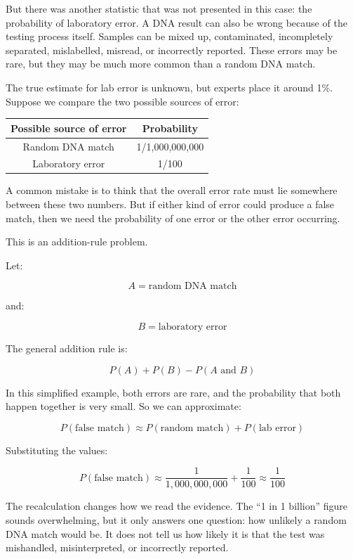 \documentclass[
  letterpaper,
  DIV=11,
  numbers=noendperiod]{scrreprt}
\begin{document}
\begin{tcolorbox}
But there was another statistic that was not presented in this case: the
probability of laboratory error. A DNA result can also be wrong because
of the testing process itself. Samples can be mixed up, contaminated,
incompletely separated, mislabelled, misread, or incorrectly reported.
These errors may be rare, but they may be much more common than a random
DNA match.

The true estimate for lab error is unknown, but experts place it around
1\%. Suppose we compare the two possible sources of error:

\begin{table}
\fontsize{12.0pt}{14.0pt}\selectfont
\begin{tabular*}{\linewidth}{@{\extracolsep{\fill}}cc}
\toprule
Possible source of error & Probability \\ 
\midrule\addlinespace[2.5pt]
Random DNA match & 1/1,000,000,000 \\ 
Laboratory error & 1/100 \\ 
\bottomrule
\end{tabular*}
\end{table}

A common mistake is to think that the overall error rate must lie
somewhere between these two numbers. But if either kind of error could
produce a false match, then we need the probability of one error or the
other error occurring.

This is an addition-rule problem.

Let:

\[A = \text{random DNA match}\]

and:

\[B = \text{laboratory error}\]

The general addition rule is:

\[P(A) + P(B) - P(A \text{ and } B)\]

In this simplified example, both errors are rare, and the probability
that both happen together is very small. So we can approximate:

\[P(\text{false match})
\approx
P(\text{random match}) + P(\text{lab error})\]

Substituting the values:

\[P(\text{false match})
\approx
\frac{1}{1{,}000{,}000{,}000}
+
\frac{1}{100}
\approx
\frac{1}{100}\]

The recalculation changes how we read the evidence. The ``1 in 1
billion'' figure sounds overwhelming, but it only answers one question:
how unlikely a random DNA match would be. It does not tell us how likely
it is that the test was mishandled, misinterpreted, or incorrectly
reported.


\end{tcolorbox}
\end{document}
